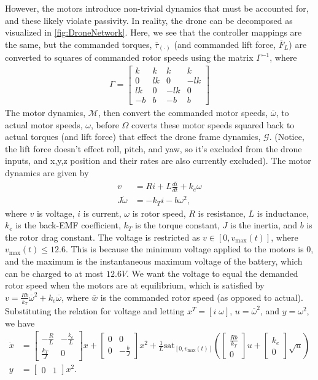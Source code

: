 \documentclass[10pt]{article}
\theoremstyle{definition}
\newcommand{\bmat}[1]{\begin{bmatrix} #1 \end{bmatrix}} %
\begin{document}
However, the motors introduce non-trivial dynamics that must be accounted for, and these likely violate passivity. In reality, the drone can be decomposed as visualized in \autoref{fig:DroneNetwork}. Here, we see that the controller mappings are the same, but the commanded torques, $\overline{\tau}_{(\cdot)}$ (and commanded lift force, $\overline{F}_L$) are converted to squares of commanded rotor speeds using the matrix $\Gamma^{-1}$, where
\begin{align*}
	\Gamma = \bmat{k & k & k & k \\ 0 & lk & 0 & -lk \\ lk & 0 & -lk & 0 \\ -b & b & -b & b}
\end{align*}
The motor dynamics, $\mathcal{M}$, then convert the commanded motor speeds, $\overline{\omega}$, to actual motor speeds, $\omega$, before $\Omega$ coverts these motor speeds squared back to actual torques (and lift force) that effect the drone frame dynamics, $\mathcal{G}$. (Notice, the lift force doesn't effect roll, pitch, and yaw, so it's excluded from the drone inputs, and x,y,z position and their rates are also currently excluded). The motor dynamics are given by 
\begin{align*}
	v &= Ri + L\frac{di}{dt} + k_e \omega \\
	J\dot{\omega} &= -k_Ti - b\omega^2,
\end{align*}
where $v$ is voltage, $i$ is current, $\omega$ is rotor speed, $R$ is resistance, $L$ is inductance, $k_e$ is the back-EMF coefficient, $k_T$ is the torque constant, $J$ is the inertia, and $b$ is the rotor drag constant. The voltage is restricted as $v \in [0,v_\mathrm{max}(t)]$, where $v_\mathrm{max}(t) \leq 12.6$. This is because the minimum voltage applied to the motors is $0$, and the maximum is the instantaneous maximum voltage of the battery, which can be charged to at most $12.6V$. We want the voltage to equal the demanded rotor speed when the motors are at equilibrium, which is satisfied by $v = \frac{Rb}{k_T}\overline{\omega}^2 + k_e\overline{\omega}$, where $\overline{w}$ is the commanded rotor speed (as opposed to actual). Substituting the relation for voltage and letting $x^T = [i \; \omega]$, $u = \overline{\omega}^2$, and $y = \omega^2$, we have
\begin{align*}
	\dot{x} &= \bmat{-\frac{R}{L} & -\frac{k_e}{L} \\ \frac{k_T}{J} & 0 }x + \bmat{0 & 0 \\ 0 & -\frac{b}{J} }x^2 + \frac{1}{L}\mathrm{sat}_{[0,v_{\mathrm{max}}(t)]}\left(\bmat{\frac{Rb}{k_T} \\ 0}u + \bmat{k_e \\ 0}\sqrt{u}\right) \\
	y &=  \bmat{0 & 1}x^2.
\end{align*}
\end{document}
